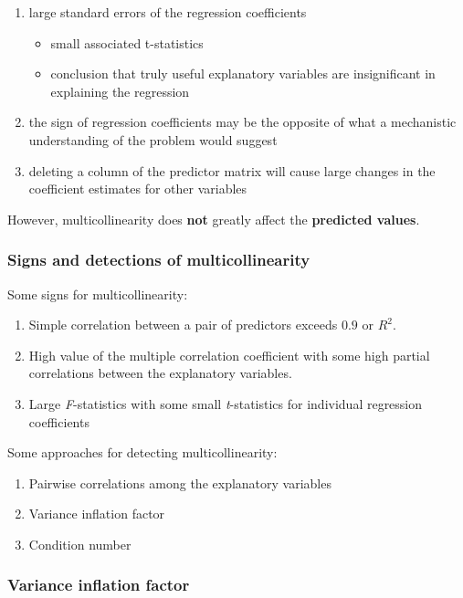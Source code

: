 \begin{enumerate}
	\item large standard errors of the regression coefficients
	\begin{itemize}
		\item small associated t-statistics
		\item conclusion that truly useful explanatory variables are insignificant in explaining the regression
	\end{itemize}
	\item the sign of regression coefficients may be the opposite of what a mechanistic understanding of the problem would suggest
	\item deleting a column of the predictor matrix will cause large changes in the coefficient estimates for other variables
\end{enumerate}

However, multicollinearity does {\bf not} greatly affect the {\bf predicted values}.

\subsubsection*{Signs and detections of multicollinearity}
\newcommand{\xstatistics}[1]{{\it #1}-statistics}
Some signs for multicollinearity:
\begin{enumerate}
	\item Simple correlation between a pair of predictors exceeds $0.9$ or $R^2$.
	\item High value of the multiple correlation coefficient with some high partial correlations between the explanatory variables.
	\item Large \xstatistics{F} with some small \xstatistics{t} for individual regression coefficients
\end{enumerate}


Some approaches for detecting multicollinearity:
\begin{enumerate}
	\item Pairwise correlations among the explanatory variables
	\item Variance inflation factor
	\item Condition number
\end{enumerate}


\subsubsection*{Variance inflation factor}

